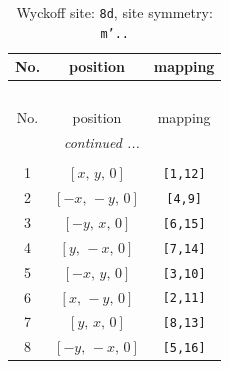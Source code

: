 \documentclass[fleqn,8pt]{jsarticle}
\begin{document}
\renewcommand{\arraystretch}{1.2}
\begin{longtable}{ccc}
\caption{Wyckoff site: {\tt 8d}, site symmetry: {\tt m'..}}
 \\
 \hline \hline
No. & position & mapping \\ \hline \endfirsthead

\multicolumn{2}{l}{\tablename\ \thetable{}} \\
 \hline \hline
No. & position & mapping \\ \hline \endhead

 \hline \hline
\multicolumn{2}{r}{\footnotesize\it continued ...} \\ \endfoot

 \hline \hline
\multicolumn{2}{r}{} \\ \endlastfoot

1 & $\left[ x,\, y,\, 0 \right]$ & {\tt [1,12]} \\ \hline
2 & $\left[ - x,\, - y,\, 0 \right]$ & {\tt [4,9]} \\ \hline
3 & $\left[ - y,\, x,\, 0 \right]$ & {\tt [6,15]} \\ \hline
4 & $\left[ y,\, - x,\, 0 \right]$ & {\tt [7,14]} \\ \hline
5 & $\left[ - x,\, y,\, 0 \right]$ & {\tt [3,10]} \\ \hline
6 & $\left[ x,\, - y,\, 0 \right]$ & {\tt [2,11]} \\ \hline
7 & $\left[ y,\, x,\, 0 \right]$ & {\tt [8,13]} \\ \hline
8 & $\left[ - y,\, - x,\, 0 \right]$ & {\tt [5,16]} \\
\end{longtable}
\renewcommand{\arraystretch}{1.2}
\end{document}
